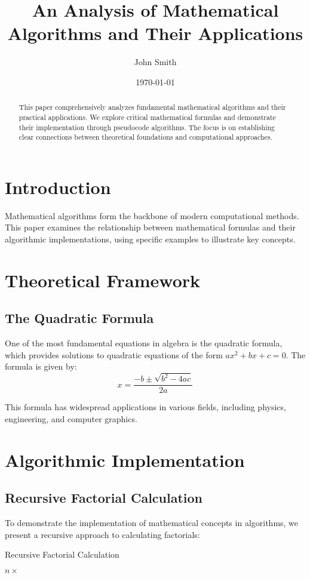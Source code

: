 \documentclass{article}
\title{An Analysis of Mathematical Algorithms and Their Applications}
\author{John Smith}
\date{\today}
\begin{document}
\maketitle

\begin{abstract}
This paper comprehensively analyzes fundamental mathematical algorithms and their practical applications. We explore critical mathematical formulas and demonstrate their implementation through pseudocode algorithms. The focus is on establishing clear connections between theoretical foundations and computational approaches.
\end{abstract}

\section{Introduction}
Mathematical algorithms form the backbone of modern computational methods. This paper examines the relationship between mathematical formulas and their algorithmic implementations, using specific examples to illustrate key concepts.

\section{Theoretical Framework}
\subsection{The Quadratic Formula}
One of the most fundamental equations in algebra is the quadratic formula, which provides solutions to quadratic equations of the form $ax^2 + bx + c = 0$. The formula is given by:
\[
x = \frac{-b \pm \sqrt{b^2 - 4ac}}{2a}
\]

This formula has widespread applications in various fields, including physics, engineering, and computer graphics.

\section{Algorithmic Implementation}
\subsection{Recursive Factorial Calculation}
To demonstrate the implementation of mathematical concepts in algorithms, we present a recursive approach to calculating factorials:

\begin{algorithm}
\caption{Recursive Factorial Calculation}
\begin{algorithmic}[1]
    \EndIf
    \State \Return $n \times$ 
\EndFunction
\end{algorithmic}
\end{algorithm}
\end{document}
